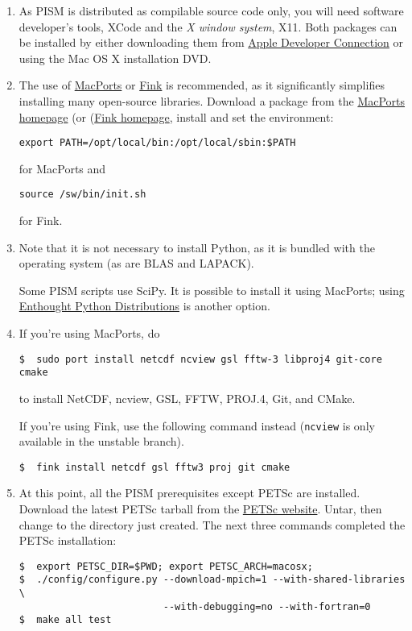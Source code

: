 \documentclass[titlepage,letterpaper,final]{scrartcl}
\begin{document}
\begin{enumerate}
\item As PISM is distributed as compilable source code only, you will need
  software developer's tools, XCode and the \emph{X window system}, X11. Both
  packages can be installed by either downloading them from
  \href{http://developer.apple.com/tools/xcode/}{Apple Developer Connection} or
  using the Mac OS X installation DVD.
\item The use of \href{http://www.macports.org/}{MacPorts} or
  \href{http://www.finkproject.org/}{Fink} is recommended, as it significantly
  simplifies installing many open-source libraries. Download a package from the
  \href{http://www.macports.org/install.php}{MacPorts homepage} (or
  (\href{http://www.finkproject.org/download/index.php}{Fink homepage}, install
  and set the environment:

\begin{verbatim}
export PATH=/opt/local/bin:/opt/local/sbin:$PATH
\end{verbatim}
for MacPorts and
\begin{verbatim}
source /sw/bin/init.sh
\end{verbatim}
for Fink.

\item Note that it is not necessary to install Python, as it is bundled with
  the operating system (as are BLAS and LAPACK).

  Some PISM scripts use SciPy. It is possible to install it using MacPorts;
  using \href{http://www.enthought.com/}{Enthought Python Distributions} is
  another option.

\item  If you're using MacPorts, do
\begin{verbatim}
$  sudo port install netcdf ncview gsl fftw-3 libproj4 git-core cmake
\end{verbatim}%
to install NetCDF, ncview, GSL, FFTW, PROJ.4, Git, and CMake.

If you're using Fink, use the following command instead (\texttt{ncview} is only available in the unstable branch).
\begin{verbatim}
$  fink install netcdf gsl fftw3 proj git cmake
\end{verbatim}

\item At this point, all the PISM prerequisites except PETSc are installed. Download the latest PETSc tarball from the
  \href{http://www.mcs.anl.gov/petsc/petsc-as/}{PETSc website}. Untar, then change to the directory just created.
The next three commands completed the PETSc installation:
\begin{verbatim}
$  export PETSC_DIR=$PWD; export PETSC_ARCH=macosx;
$  ./config/configure.py --download-mpich=1 --with-shared-libraries \
                         --with-debugging=no --with-fortran=0
$  make all test
\end{verbatim}


\end{enumerate}
\end{document}
